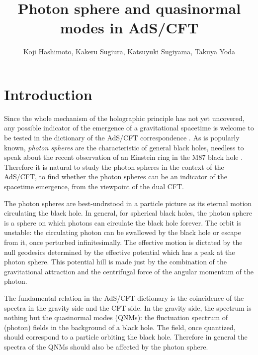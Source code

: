 \documentclass[a4paper,11pt]{article}
\title{
Photon sphere and quasinormal modes in AdS/CFT
}
\author{Koji Hashimoto, Kakeru Sugiura, Katsuyuki Sugiyama, Takuya Yoda}
\affiliation{Department of Physics, Kyoto University, Sakyo-ku, Kyoto 606-8502, Japan}
\begin{document}
 
\maketitle
\flushbottom







\section{Introduction}

Since the whole mechanism of the holographic principle has not yet uncovered, any possible indicator of the emergence of a gravitational spacetime is welcome to be tested in the dictionary of the AdS/CFT correspondence \cite{Maldacena:1997re}. 
As is popularly known, {\it photon spheres} are the characteristic of general black holes, 
needless to speak about the recent observation of an Einstein ring in the M87 black hole \cite{EventHorizonTelescope:2019dse}.
Therefore it is natural to study the photon spheres in the context of the AdS/CFT, to find whether
the photon spheres can be an indicator of the spacetime emergence, from the viewpoint of the dual CFT.

The photon spheres are best-undrstood in a particle picture as its eternal motion circulating the black hole. In general,
for spherical black holes, the photon sphere is a sphere on which photons can circulate the black hole forever. The orbit is unstable: the circulating photon can be swallowed by the black hole or escape from it, once perturbed infinitesimally. The effective motion is dictated by the null geodesics  determined by the effective potential which has a peak at the photon sphere. This potential hill
is made just by the combination of the gravitational attraction and the centrifugal force of the angular momentum of the photon.

The fundamental relation in the AdS/CFT dictionary 
is the coincidence of the spectra in the gravity side and the CFT side.
In the gravity side, the spectrum is nothing but the quasinormal modes (QNMs): the fluctuation spectrum
of (photon) fields in the background of a black hole. 
The field, once quantized, should correspond to a particle orbiting the black hole. Therefore
in general the spectra of the QNMs should also be affected by the photon sphere.
\end{document}
